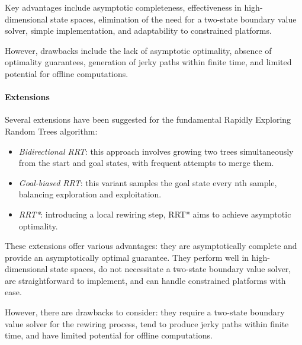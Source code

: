 Key advantages include asymptotic completeness, effectiveness in high-dimensional state spaces, elimination of the need for a two-state boundary value solver, simple implementation, and adaptability to constrained platforms.

However, drawbacks include the lack of asymptotic optimality, absence of optimality guarantees, generation of jerky paths within finite time, and limited potential for offline computations.

\paragraph*{Extensions}
Several extensions have been suggested for the fundamental Rapidly Exploring Random Trees algorithm:
\begin{itemize}
    \item \textit{Bidirectional RRT}: this approach involves growing two trees simultaneously from the start and goal states, with frequent attempts to merge them.
    \item \textit{Goal-biased RRT}: this variant samples the goal state every nth sample, balancing exploration and exploitation.
    \item \textit{RRT*}: introducing a local rewiring step, RRT* aims to achieve asymptotic optimality.
\end{itemize}
These extensions offer various advantages: they are asymptotically complete and provide an asymptotically optimal guarantee. 
They perform well in high-dimensional state spaces, do not necessitate a two-state boundary value solver, are straightforward to implement, and can handle constrained platforms with ease.

However, there are drawbacks to consider: they require a two-state boundary value solver for the rewiring process, tend to produce jerky paths within finite time, and have limited potential for offline computations.